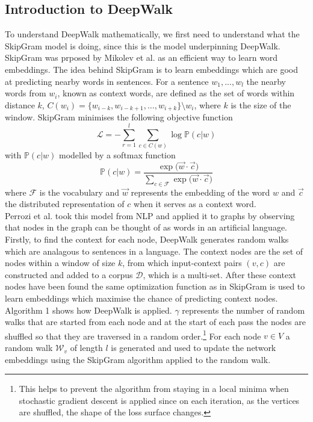 \documentclass[a4paper]{article}
\renewcommand{\P}{\mathbb P}
\newcommand{\D}{\mathcal D}
\begin{document}
\subsection{Introduction to DeepWalk}
To understand DeepWalk mathematically, we first need to understand what the SkipGram
model is doing, since this is the model underpinning DeepWalk. SkipGram was
prposed by Mikolev et al.\cite{mikolov2013efficient} as an efficient way to
learn word embeddings. The idea behind SkipGram is to learn embeddings which are good at
predicting nearby words in sentences. For a sentence $w_1, ... , w_l$ the
nearby words from $w_i$, known as context words, are defined as the set of words
within distance $k$, $C(w_i) = \{w_{i-k}, w_{i-k+1}, \dots , w_{i+k}\} \setminus w_i$, where $k$ is the size of the window. SkipGram
minimises the following objective function
\[\mathcal{L} = - \sum_{r = 1}^{l} \sum_{c \in C(w)} \log{\P(c | w)}\]
with $\P(c | w)$ modelled by a softmax function
\[\P(c|w) = \frac{\exp{(\vec{w} \cdot \vec{c}})}{\sum_{c \in \mathcal{F}}\exp{(\vec{w} \cdot
    \vec{c}})}\]
where $\mathcal{F}$ is the vocabulary and $\vec{w}$ represents the
embedding of the word $w$ and $\vec{c}$ the distributed representation of $c$ when it serves as a
context word.\\
Perrozi et al. took this model from NLP and applied it to graphs by observing
that nodes in the graph can be thought of as words in an artificial language.
Firstly, to find the context for each node, DeepWalk generates random walks
which are analagous to sentences in a language. The context nodes are the set of
nodes within a window of size $k$, from which input-context pairs $(v, c)$ are
constructed and added to a corpus $\D$, which is a multi-set. After these context nodes have been
found the same optimization function as in SkipGram is used to learn embeddings which maximise
the chance of predicting context nodes.\\
Algorithm 1 shows how DeepWalk is applied. $\gamma$ represents the number of
random walks that are started from each node and at the start of each pass the
nodes are shuffled so that they are traversed in a random order.\footnote{This
  helps to prevent the algorithm from staying in a local minima when stochastic
  gradient descent is applied since on each iteration, as the vertices
  are shuffled, the shape of the loss surface changes.} For each node
$v \in V$ a random walk $\mathcal{W}_v$ of length $l$ is generated and used to
update the network embeddings using the SkipGram algorithm applied to the random
walk.\\
\end{document}
